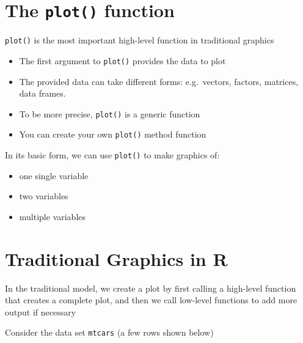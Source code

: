 \documentclass[
]{book}
\begin{document}
\hypertarget{the-plot-function}{%
\section{\texorpdfstring{The \texttt{plot()} function}{The plot() function}}\label{the-plot-function}}

\texttt{plot()} is the most important high-level function in traditional graphics

\begin{itemize}
\item
  The first argument to \texttt{plot()} provides the data to plot
\item
  The provided data can take different forms: e.g.~vectors, factors, matrices,
  data frames.
\item
  To be more precise, \texttt{plot()} is a generic function
\item
  You can create your own \texttt{plot()} method function
\end{itemize}

In its basic form, we can use \texttt{plot()} to make graphics of:

\begin{itemize}
\item
  one single variable
\item
  two variables
\item
  multiple variables
\end{itemize}

\hypertarget{traditional-graphics-in-r}{%
\section{Traditional Graphics in R}\label{traditional-graphics-in-r}}

In the traditional model, we create a plot by first calling a high-level
function that creates a complete plot, and then we call low-level functions
to add more output if necessary

Consider the data set \texttt{mtcars} (a few rows shown below)
\end{document}
